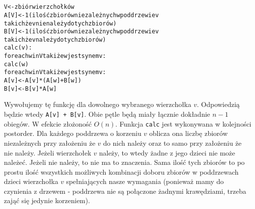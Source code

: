\documentclass[a4paper,12pt]{article}
\begin{document}
\section{}
\begin{alltt}
V <- zbiór wierzchołków
A[V] <- 1 (ilość zbiorów niezależnych w poddrzewie v 
            takich że v nie należy do tych zbiorów)
B[V] <- 1 (ilość zbiorów niezależnych w poddrzewie v 
            takich że v należy do tych zbiorów)
calc(v):
    for each w in V taki że w jest synem v:
        calc(w)
    for each w in V taki że w jest synem v:
        A[v] <- A[v] * (A[w] + B[w])
        B[v] <- B[v] * A[w]

\end{alltt}
Wywołujemy tę funkcję dla dowolnego wybranego wierzchołka $v$. Odpowiedzią będzie wtedy \verb|A[v] + B[v]|. Obie pętle będą miały łącznie dokładnie $n-1$ obiegów. W efekcie złożoność $O(n)$. Funkcja \verb|calc| jest wykonywana w kolejności postorder. Dla każdego poddrzewa o korzeniu $v$ oblicza ona liczbę zbiorów niezależnych przy założeniu że $v$ do nich należy oraz to samo przy założeniu że nie należy. Jeżeli wierzchołek $v$ należy, to wtedy żadne z jego dzieci nie może należeć. Jeżeli nie należy, to nie ma to znaczenia. Sama ilość tych zbiorów to po prostu ilość wszystkich możliwych kombinacji doboru zbiorów w poddrzewach dzieci wierzchołka $v$ spełniających nasze wymagania (ponieważ mamy do czynienia z drzewem - poddrzewa nie są połączone żadnymi krawędziami, trzeba zająć się jedynie korzeniem).
\end{document}
